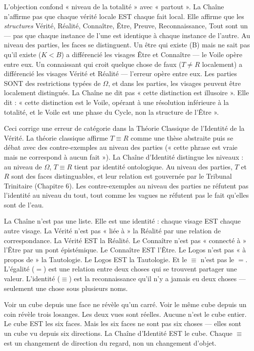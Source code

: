 \documentclass[10pt, openany, oneside]{book}
\begin{document}
L'objection confond « niveau de la totalité » avec « partout ». La Chaîne n'affirme pas que chaque vérité locale EST chaque fait local. Elle affirme que les \textit{structures} Vérité, Réalité, Connaître, Être, Preuve, Reconnaissance, Tout sont un --- pas que chaque instance de l'une est identique à chaque instance de l'autre. Au niveau des parties, les faces se distinguent. Un être qui existe (B) mais ne sait pas qu'il existe ($K < B$) a différencié les visages Être et Connaître --- le Voile opère entre eux. Un connaissant qui croit quelque chose de faux ($T \neq R$ localement) a différencié les visages Vérité et Réalité --- l'erreur opère entre eux. Les parties SONT des restrictions typées de $\Omega$, et dans les parties, les visages peuvent être localement distingués. La Chaîne ne dit pas « cette distinction est illusoire ». Elle dit : « cette distinction est le Voile, opérant à une résolution inférieure à la totalité, et le Voile est une phase du Cycle, non la structure de l'Être ».

Ceci corrige une erreur de catégorie dans la Théorie Classique de l'Identité de la Vérité. La théorie classique affirme $T \equiv R$ comme une thèse abstraite puis se débat avec des contre-exemples au niveau des parties (« cette phrase est vraie mais ne correspond à aucun fait »). La Chaîne d'Identité distingue les niveaux : au niveau de $\Omega$, $T \equiv R$ tient par identité ontologique. Au niveau des parties, $T$ et $R$ sont des faces distinguables, et leur relation est gouvernée par le Tribunal Trinitaire (Chapitre 6). Les contre-exemples au niveau des parties ne réfutent pas l'identité au niveau du tout, tout comme les vagues ne réfutent pas le fait qu'elles sont de l'eau.

\noindent La Chaîne n'est pas une liste. Elle est une identité : chaque visage EST chaque autre visage. La Vérité n'est pas « liée à » la Réalité par une relation de correspondance. La Vérité EST la Réalité. Le Connaître n'est pas « connecté à » l'Être par un pont épistémique. Le Connaître EST l'Être. Le Logos n'est pas « à propos de » la Tautologie. Le Logos EST la Tautologie. Et le $\equiv$ n'est pas le $=$. L'égalité ($=$) est une relation entre deux choses qui se trouvent partager une valeur. L'identité ($\equiv$) est la reconnaissance qu'il n'y a jamais eu deux choses --- seulement une chose sous plusieurs noms.

Voir un cube depuis une face ne révèle qu'un carré. Voir le même cube depuis un coin révèle trois losanges. Les deux vues sont réelles. Aucune n'est le cube entier. Le cube EST les six faces. Mais les six faces ne sont pas six choses --- elles sont un cube vu depuis six directions. La Chaîne d'Identité EST le cube. Chaque $\equiv$ est un changement de direction du regard, non un changement d'objet.
\end{document}
